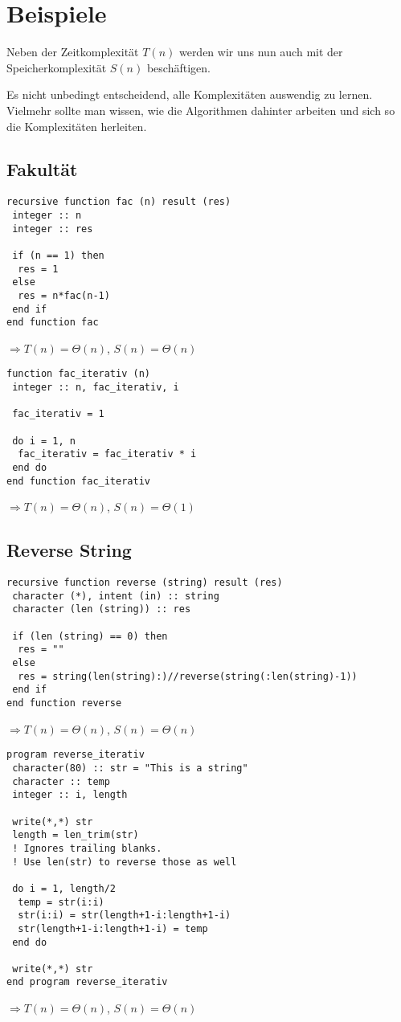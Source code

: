 \section{Beispiele}

Neben der Zeitkomplexität $T(n)$ werden wir uns nun auch mit der Speicherkomplexität $S(n)$ beschäftigen.

\begin{*anmerkung}
	Es nicht unbedingt entscheidend, alle Komplexitäten auswendig zu lernen. Vielmehr sollte man wissen, wie die Algorithmen dahinter arbeiten und sich so die Komplexitäten herleiten.
\end{*anmerkung}

\subsection{Fakultät}
\begin{lstlisting}
recursive function fac (n) result (res) 
 integer :: n
 integer :: res
 
 if (n == 1) then 
  res = 1
 else
  res = n*fac(n-1)
 end if
end function fac
\end{lstlisting}
$\Rightarrow T(n) = \Theta(n)$, $S(n)=\Theta(n)$

\begin{lstlisting}
function fac_iterativ (n)
 integer :: n, fac_iterativ, i
 
 fac_iterativ = 1
 
 do i = 1, n
  fac_iterativ = fac_iterativ * i
 end do
end function fac_iterativ
\end{lstlisting}
$\Rightarrow T(n)=\Theta(n)$, $S(n)=\Theta(1)$

\subsection{Reverse String}
\begin{lstlisting}
recursive function reverse (string) result (res)
 character (*), intent (in) :: string
 character (len (string)) :: res

 if (len (string) == 0) then
  res = ""
 else
  res = string(len(string):)//reverse(string(:len(string)-1))
 end if
end function reverse
\end{lstlisting}
$\Rightarrow T(n) = \Theta(n)$, $S(n)=\Theta(n)$

\begin{lstlisting}
program reverse_iterativ
 character(80) :: str = "This is a string"
 character :: temp
 integer :: i, length

 write(*,*) str
 length = len_trim(str) 
 ! Ignores trailing blanks. 
 ! Use len(str) to reverse those as well
 
 do i = 1, length/2
  temp = str(i:i)
  str(i:i) = str(length+1-i:length+1-i)
  str(length+1-i:length+1-i) = temp
 end do
 
 write(*,*) str
end program reverse_iterativ
\end{lstlisting}
$\Rightarrow T(n) = \Theta(n)$, $S(n)=\Theta(n)$

